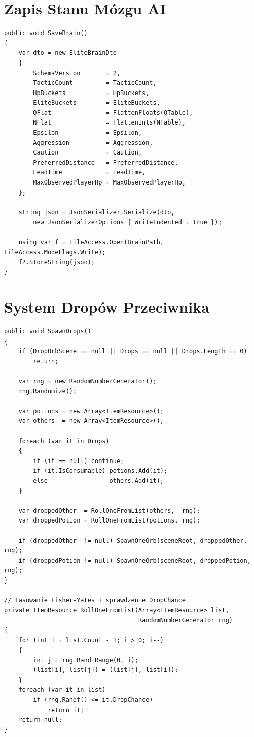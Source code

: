 \section{Zapis Stanu Mózgu AI}

\begin{lstlisting}[caption={EliteBrain.SaveBrain (fragment) - serializacja do JSON},label={lst:eb-save}]
public void SaveBrain()
{
    var dto = new EliteBrainDto
    {
        SchemaVersion       = 2,
        TacticCount         = TacticCount,
        HpBuckets           = HpBuckets,
        EliteBuckets        = EliteBuckets,
        QFlat               = FlattenFloats(QTable),
        NFlat               = FlattenInts(NTable),
        Epsilon             = Epsilon,
        Aggression          = Aggression,
        Caution             = Caution,
        PreferredDistance   = PreferredDistance,
        LeadTime            = LeadTime,
        MaxObservedPlayerHp = MaxObservedPlayerHp,
    };

    string json = JsonSerializer.Serialize(dto,
        new JsonSerializerOptions { WriteIndented = true });

    using var f = FileAccess.Open(BrainPath, FileAccess.ModeFlags.Write);
    f?.StoreString(json);
}
\end{lstlisting}

\section{System Dropów Przeciwnika}

\begin{lstlisting}[caption={Enemy.SpawnDrops - losowanie z Fisher-Yates},label={lst:drops}]
public void SpawnDrops()
{
    if (DropOrbScene == null || Drops == null || Drops.Length == 0)
        return;

    var rng = new RandomNumberGenerator();
    rng.Randomize();

    var potions = new Array<ItemResource>();
    var others  = new Array<ItemResource>();

    foreach (var it in Drops)
    {
        if (it == null) continue;
        if (it.IsConsumable) potions.Add(it);
        else                 others.Add(it);
    }

    var droppedOther  = RollOneFromList(others,  rng);
    var droppedPotion = RollOneFromList(potions, rng);

    if (droppedOther  != null) SpawnOneOrb(sceneRoot, droppedOther,  rng);
    if (droppedPotion != null) SpawnOneOrb(sceneRoot, droppedPotion, rng);
}

// Tasowanie Fisher-Yates + sprawdzenie DropChance
private ItemResource RollOneFromList(Array<ItemResource> list,
                                     RandomNumberGenerator rng)
{
    for (int i = list.Count - 1; i > 0; i--)
    {
        int j = rng.RandiRange(0, i);
        (list[i], list[j]) = (list[j], list[i]);
    }
    foreach (var it in list)
        if (rng.Randf() <= it.DropChance)
            return it;
    return null;
}
\end{lstlisting}

